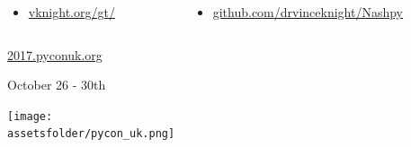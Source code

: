 \documentclass{beamer}
\newcommand{\assetsfolder}{./assets}
\begin{document}
\begin{frame}
   \begin{columns}
        \begin{column}{.4\textwidth}
            \begin{itemize}
                \item
                    \href{https://vknight.org/gt/}{vknight.org/gt/}
            \end{itemize}
        \end{column}
        \begin{column}{.6\textwidth}
            \begin{itemize}
                \item \href{https://github.com/drvinceknight/Nashpy}{github.com/drvinceknight/Nashpy}
            \end{itemize}
        \end{column}
   \end{columns}
\end{frame}

\begin{frame}
    \begin{center}
        \Huge
        \href{http://2017.pyconuk.org/}{2017.pyconuk.org}

        \large
        October 26 - 30th

        \vfill
        \texttt{[image: \\assetsfolder/pycon\_uk.png]}

    \end{center}
\end{frame}
\end{document}
